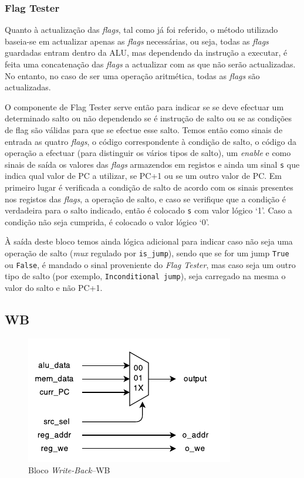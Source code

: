 \documentclass[a4paper]{article}
\begin{document}
			\subsubsection{Flag Tester}
			
				Quanto à actualização das \textit{flags}, tal como já foi referido, o método utilizado baseia-se em actualizar apenas as \textit{flags} necessárias, ou seja, todas as \textit{flags} guardadas entram dentro da ALU, mas dependendo da instrução a executar, é feita uma concatenação das \textit{flags} a actualizar com as que não serão actualizadas. No entanto, no caso de ser uma operação aritmética, todas as \textit{flags} são actualizadas.
			
				O componente de Flag Tester serve então para indicar se se deve efectuar um determinado salto ou não dependendo se é instrução de salto ou se as condições de flag são válidas para que se efectue esse salto. Temos então como sinais de entrada as quatro \textit{flags}, o código correspondente à condição de salto, o código da operação a efectuar (para distinguir os vários tipos de salto), um \textit{enable} e como sinais de saída os valores das \textit{flags} armazendos em registos e ainda um sinal \texttt{s} que indica qual valor de PC a utilizar, se PC+1 ou se um outro valor de PC. Em primeiro lugar é verificada a condição de salto de acordo com os sinais presentes nos registos das \textit{flags}, a operação de salto, e caso se verifique que a condição é verdadeira para o salto indicado, então é colocado \texttt{s} com valor lógico ‘1’. Caso a condição não seja cumprida, é colocado o valor lógico ‘0’. 
				
				À saída deste bloco temos ainda lógica adicional para indicar caso não seja uma operação de salto (\textit{mux} regulado por \texttt{is\_jump}), sendo que se for um jump \texttt{True} ou \texttt{False}, é mandado o sinal proveniente do \emph{Flag Tester}, mas caso seja um outro tipo de salto (por exemplo, \texttt{Inconditional jump}), seja carregado na mesma o valor do salto e não PC+1.
			
				
		\subsection{WB}
		
			\begin{figure}[H]
				\centering
				\includegraphics[width=.8\textwidth]{img/WB}
				\caption{Bloco \textit{Write-Back}--WB}
				\label{fig:wb}
			\end{figure}
			
\end{document}
